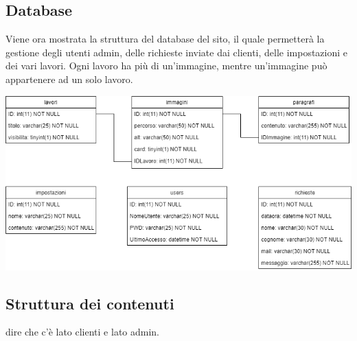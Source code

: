 \subsection{Database}
Viene ora mostrata la struttura del database del sito, il quale permetterà la gestione degli utenti admin, delle richieste inviate dai clienti, delle impostazioni e dei vari lavori. Ogni lavoro ha più di un'immagine, mentre un'immagine può appartenere ad un solo lavoro.
\begin{center}
\includegraphics[scale = 0.5]{../latex/images/db.png}\\[1.5cm]
\end{center}

\subsection{Struttura dei contenuti}
dire che c'è lato clienti e lato admin.

